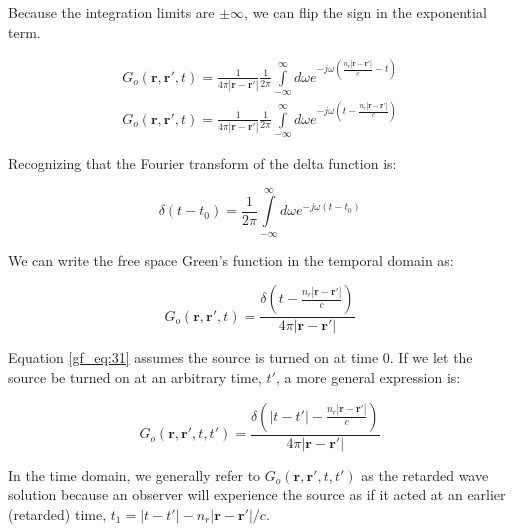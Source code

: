 \noindent Because the integration limits are $\pm\infty$, we can flip the sign in the exponential term.

\begin{equation}
\begin{gathered}
G_o\left(\mathbf{r},\mathbf{r}',t\right) = \frac{1}{4\pi |\mathbf{r}-\mathbf{r}'|}\frac{1}{2\pi}\int\limits_{-\infty}^{\infty}d\omega e^{-j\omega\left(\frac{n_r|\mathbf{r}-\mathbf{r}'|}{c} - t\right)} \\
G_o\left(\mathbf{r},\mathbf{r}',t\right) = \frac{1}{4\pi |\mathbf{r}-\mathbf{r}'|}\frac{1}{2\pi}\int\limits_{-\infty}^{\infty}d\omega e^{-j\omega\left(t - \frac{n_r|\mathbf{r}-\mathbf{r}'|}{c}\right)}
\end{gathered}
\label{gf_eq:29a}
\end{equation}
\renewcommand{\baselinestretch}{2} \small\normalsize

\noindent Recognizing that the Fourier transform of the delta function is:

\begin{equation}
\delta(t-t_0) = \frac{1}{2\pi}\int\limits_{-\infty}^{\infty}d\omega e^{-j\omega \left(t-t_0\right)}
\label{gf_eq:30}
\end{equation}
\renewcommand{\baselinestretch}{2} \small\normalsize

\noindent We can write the free space Green's function in the temporal domain as:

\begin{equation}
G_o\left(\mathbf{r},\mathbf{r}',t\right) = \frac{\delta\left(t-\frac{n_r|\mathbf{r}-\mathbf{r}'|}{c} \right)}{4\pi |\mathbf{r}-\mathbf{r}'|}
\label{gf_eq:31}
\end{equation}
\renewcommand{\baselinestretch}{2} \small\normalsize

Equation \ref{gf_eq:31} assumes the source is turned on at time $0$. If we let the source be turned on at an arbitrary time, $t'$, a more general expression is:

\begin{equation}
\boxed{G_o\left(\mathbf{r},\mathbf{r}',t,t'\right) = \frac{\delta\left(|t-t'|-\frac{n_r|\mathbf{r}-\mathbf{r}'|}{c} \right)}{4\pi |\mathbf{r}-\mathbf{r}'|}}
\label{gf_eq:32}
\end{equation}
\renewcommand{\baselinestretch}{2} \small\normalsize

In the time domain, we generally refer to $G_o\left(\mathbf{r},\mathbf{r}',t, t'\right)$ as the retarded wave solution because an observer will experience the source as if it acted at an earlier (retarded) time, $t_1=|t-t'|-n_r|\mathbf{r}-\mathbf{r}'|/c$.

